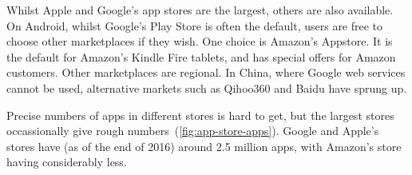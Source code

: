 \documentclass[thesis.tex]{subfiles}
\begin{document}
%

Whilst Apple and Google's app stores are the largest, others are also
available.  On Android, whilst Google's Play Store is often the
default, users are free to choose other marketplaces if they wish.
One choice is Amazon's Appstore.  It is the default for Amazon's
Kindle Fire tablets, and has special offers for Amazon customers.
Other marketplaces are regional.  In China, where Google web services
cannot be used, alternative markets such as Qihoo360 and Baidu have
sprung up.

Precise numbers of apps in different stores is hard to get, but the
largest stores occassionally give rough
numbers~(\autoref{fig:app-store-apps}).  Google and Apple's stores
have (as of the end of 2016) around 2.5 million apps, with Amazon's
store having considerably less.
\end{document}
